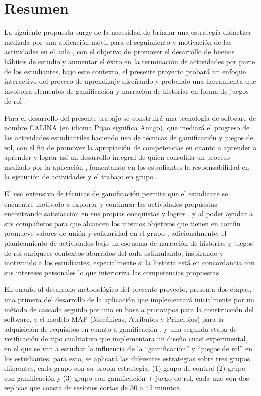 \section*{Resumen}

\begin{singlespace}
La siguiente propuesta surge de la necesidad de brindar una estrategia didáctica mediada por una aplicación 
móvil para el seguimiento y motivación de las actividades en el aula \cite{SAILER2017371, DAROCHASEIXAS201648}, 
con el objetivo de promover el desarrollo de buenos hábitos de estudio y aumentar el éxito en la terminación 
de actividades por parte de los estudiantes, bajo este contexto, el presente proyecto probará un enfoque 
interactivo del proceso de aprendizaje diseñando y probando una herramienta que involucra elementos de 
gamificación y narración de historias en forma de juegos de rol \cite{rauscher2021comics}.

Para el desarrollo del presente trabajo se construirá una tecnología de software de nombre CALINA (en idioma 
Pijao significa Amigo), que mediará el progreso de las actividades estudiantiles haciendo uso de técnicas de 
gamificación y juegos de rol, con el fin de promover la apropiación de competencias en cuanto a aprender a 
aprender y lograr así un desarrollo integral de quien consolida un proceso mediado por la aplicación 
\cite{tornero2016ideas, molina_reconfiguracion_2021}, fomentando en los estudiantes la responsabilidad en la 
ejecución de actividades y el trabajo en grupo \cite{XU2017}.

El uso extensivo de técnicas de gamificación permite que el estudiante se encuentre motivado a explorar y 
continuar las actividades propuestas encontrando satisfacción en sus propias conquistas y logros 
\cite{Danka2020, MULLINS2020304}, y al poder ayudar a sus compañeros para que alcancen los mismos objetivos 
que tienen en común promueve valores de unión y solidaridad en el grupo \cite{DING20191}, adicionalmente, el 
planteamiento de actividades bajo un esquema de narración de historias y juegos de rol enriquece contextos 
aburridos del aula estimulando, inspirando y motivando a los estudiantes, especialmente si la historia está en 
concordancia con sus intereses personales lo que interioriza las competencias propuestas 
\cite{8190501, Young2015199}. 

En cuanto al desarrollo metodológico del presente proyecto, presenta dos etapas, una primera del desarrollo de 
la aplicación que implementará inicialmente por un método de cascada seguido por uno en base a prototipos para 
la construcción del software, y el modelo MAP (Mecánicas, Atributos y Principios) para la adquisición de 
requisitos en cuanto a gamificación \cite{CECHELLA2018}, y una segunda etapa de verificación de tipo 
cualitativo que implementara un diseño cuasi experimental, en el que se van a estudiar la influencia de la 
``gamificación'' y ``juegos de rol'' en los estudiantes, para esto, se aplicará las diferentes estrategias 
sobre tres grupos diferentes, cada grupo con su propia estrategia, (1) grupo de control (2) grupo con 
gamificación y (3) grupo con gamificación + juego de rol, cada uno con dos replicas que consta de sesiones 
cortas de 30 a 45 minutos. 


\end{singlespace}
